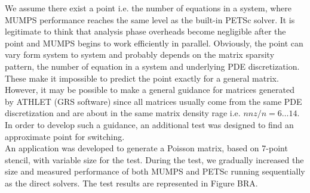 We assume there exist a point i.e. the number of equations in a system, where MUMPS performance reaches the same level as the built-in PETSc solver. It is legitimate to think that analysis phase overheads become negligible after the point and MUMPS begins to work efficiently in parallel. Obviously, the point can vary form system to system and probably depends on the matrix sparsity pattern, the number of equation in a system and underlying PDE discretization. These make it impossible to predict the point exactly for a general matrix. However, it may be possible to make a general guidance for matrices generated by ATHLET (GRS software) since all matrices usually come from the same PDE discretization and are about in the same matrix density rage i.e. $nnz / n = {6 \dots 14}$. In order to develop such a guidance, an additional test was designed to find an approximate point for switching.\\


An application was developed to generate a Poisson matrix, based on 7-point stencil, with variable size for the test. During the test, we gradually increased the size and measured performance of both MUMPS and PETSc running sequentially as the direct solvers. The test results are represented in Figure BRA.\\






